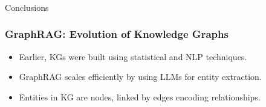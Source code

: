 





\begin{frame}[fragile]\frametitle{}
\begin{center}
{\Large Conclusions}

\end{center}
\end{frame}

\begin{frame}[fragile]\frametitle{GraphRAG: Evolution of Knowledge Graphs}
    \begin{itemize}
        \item Earlier, KGs were built using statistical and NLP techniques.
        \item GraphRAG scales efficiently by using LLMs for entity extraction.
        \item Entities in KG are nodes, linked by edges encoding relationships.
    \end{itemize}
\end{frame}

